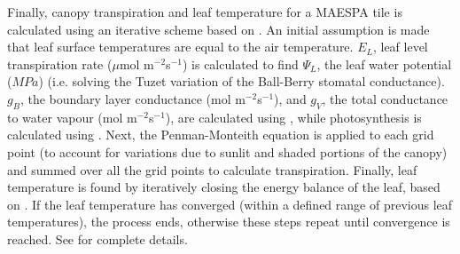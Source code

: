 \documentclass[final,3p,times,authoryear]{elsarticle}
\begin{document}
Finally, canopy transpiration and leaf temperature for a MAESPA tile is calculated using an iterative scheme based on \cite{Wang1998}. An initial assumption is made that leaf surface temperatures are equal to the air temperature. $E_{L}$, leaf level transpiration rate ($\mu$mol m$^{-2}$s$^{-1}$) is calculated to find $\Psi_{L}$, the leaf water potential ($MPa$) (i.e. solving the Tuzet variation of the Ball-Berry stomatal conductance). $g_{B}$, the boundary layer conductance (mol m$^{-2}$s$^{-1}$), and $g_{V}$, the total conductance to water vapour (mol m$^{-2}$s$^{-1}$), are calculated using \cite{Jones1992}, while photosynthesis is calculated using \cite{Farquhar1980}. Next, the Penman-Monteith equation \citep{Penman1948,Monteith1965} is applied to each grid point (to account for variations due to sunlit and shaded portions of the canopy) and summed over all the grid points to calculate transpiration. Finally, leaf temperature is found by iteratively closing the energy balance of the leaf, based on \cite{Wang1998}. If the leaf temperature has converged (within a defined range of previous leaf temperatures), the process ends, otherwise these steps repeat until convergence is reached. See \cite{Duursma2012,Medlyn2007} for complete details.



% 
%
%
%
\end{document}
